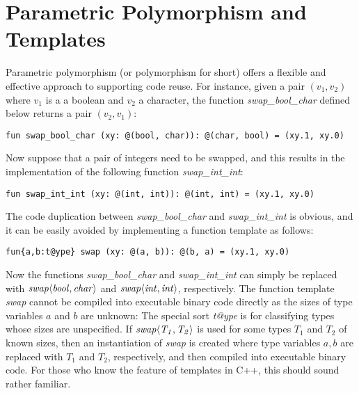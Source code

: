 \section{Parametric Polymorphism and Templates}
Parametric polymorphism (or polymorphism for short) offers a flexible and
effective approach to supporting code reuse. For instance, given a pair $(v_1,
v_2)$ where $v_1$ is a a boolean and $v_2$ a character, the function {\it
swap\_bool\_char} defined below returns a pair $(v_2, v_1)$:
\begin{verbatim}
fun swap_bool_char (xy: @(bool, char)): @(char, bool) = (xy.1, xy.0)
\end{verbatim}
Now suppose that a pair of integers need to be swapped, and this results in
the implementation of the following function {\it swap\_int\_int}:
\begin{verbatim}
fun swap_int_int (xy: @(int, int)): @(int, int) = (xy.1, xy.0)
\end{verbatim}
The code duplication between {\it swap\_bool\_char} and {\it
swap\_int\_int} is obvious, and it can be easily avoided by implementing a
function template as follows:
\begin{verbatim}
fun{a,b:t@ype} swap (xy: @(a, b)): @(b, a) = (xy.1, xy.0)
\end{verbatim}
Now the functions {\it swap\_bool\_char} and {\it swap\_int\_int} can
simply be replaced with ${\it swap\langle bool,char\rangle}$ and ${\it
swap\langle int,int\rangle}$, respectively. The function template {\it
swap} cannot be compiled into executable binary code directly as the sizes
of type variables $a$ and $b$ are unknown: The special sort {\it t@ype} is
for classifying types whose sizes are unspecified. If ${\it swap\langle
T_1,T_2\rangle}$ is used for some types $T_1$ and $T_2$ of known sizes,
then an instantiation of {\it swap} is created where type variables $a,b$
are replaced with $T_1$ and $T_2$, respectively, and then compiled into
executable binary code. For those who know the feature of templates in C++,
this should sound rather familiar.

